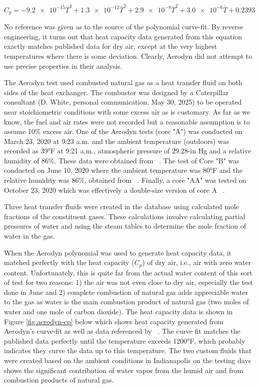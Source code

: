 \documentclass[12pt]{article}
\begin{document}
$$ C_p = \num{-9.2e-15} \bar{T}^4 + \num{1.3e-12} \bar{T}^3 + \num{2.9e-8} \bar{T}^2 +\num{3.0e-6} \bar{T} +0.2393 $$

No reference was given as to the source of the polynomial curve-fit. By reverse engineering, it turns out that heat capacity data generated from this equation exactly matches published data for dry air, except at the very highest temperatures where there is some deviation. Clearly, Aerodyn did not attempt to use precise properties in their analysis.

The Aerodyn test used combusted natural gas as a heat transfer fluid on both sides of the heat exchanger. The combustor was designed by a Caterpillar consultant (D. White, personal communication, May 30, 2025) to be operated near stoichiometric conditions with some excess air as is customary. As far as we know, the fuel and air rates were not recorded but a reasonable assumption is to assume 10\% excess air. One of the Aerodyn tests (core "A") was conducted on March 23, 2020 at 9:23 a.m. and the ambient temperature (outdoors) was recorded as 39°F at 9:21 a.m., atmospheric pressure of 29.28-in Hg and a relative humidity of 86\%. These data were obtained from ~\parencite{wunderground2025a}. The test of Core "B" was conducted on June 10, 2020 where the ambient temperature was 80°F and the relative humidity was 86\%, obtained from ~\parencite{wunderground2025b}. Finally, a core "AA" was tested on October 23, 2020 which was effectively a double-size version of core A ~\parencite{wunderground2025c}.

Three heat transfer fluids were created in the database using calculated mole fractions of the constituent gases. These calculations involve calculating partial pressures of water and using the steam tables to determine the mole fraction of water in the gas. 
	
When the Aerodyn polynomial was used to generate heat capacity data, it matched perfectly with the heat capacity ($C_p$) of dry air, i.e., air with zero water content. Unfortunately, this is quite far from the actual water content of this sort of test for two reasons: 1) the air was not even close to dry air, especially the test done in June and 2) complete combustion of natural gas adds appreciable water to the gas as water is the main combustion product of natural gas (two moles of water and one mole of carbon dioxide). The heat capacity data is shown in Figure
 \ref{fig:aerodyn-cp} below which shows heat capacity generated from Aerodyn's curve-fit as well as data referenced by ~\parencite{fraas1965}. The curve fit matches the published data perfectly until the temperature exceeds 1200°F, which probably indicates they curve the data up to this temperature. The two custom fluids that were created based on the ambient conditions in Indianapolis on the testing days shows the significant contribution of water vapor from the humid air and from combustion products of natural gas.
\end{document}
